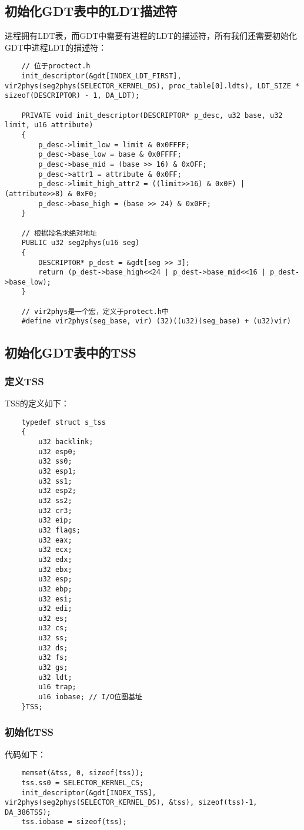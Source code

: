 \documentclass[a4paper,left=2.5cm,right=2.5cm,11pt]{report}
\begin{document}
\subsection{初始化GDT表中的LDT描述符}
	进程拥有LDT表，而GDT中需要有进程的LDT的描述符，所有我们还需要初始化GDT中进程LDT的描述符：
	\begin{lstlisting}
	// 位于proctect.h
	init_descriptor(&gdt[INDEX_LDT_FIRST], vir2phys(seg2phys(SELECTOR_KERNEL_DS), proc_table[0].ldts), LDT_SIZE * sizeof(DESCRIPTOR) - 1, DA_LDT);

	PRIVATE void init_descriptor(DESCRIPTOR* p_desc, u32 base, u32 limit, u16 attribute)
	{
		p_desc->limit_low = limit & 0x0FFFF;
		p_desc->base_low = base & 0x0FFFF;
		p_desc->base_mid = (base >> 16) & 0x0FF;
		p_desc->attr1 = attribute & 0x0FF;
		p_desc->limit_high_attr2 = ((limit>>16) & 0x0F) | (attribute>>8) & 0xF0;
		p_desc->base_high = (base >> 24) & 0x0FF;
	}

	// 根据段名求绝对地址
	PUBLIC u32 seg2phys(u16 seg)
	{
		DESCRIPTOR* p_dest = &gdt[seg >> 3];
		return (p_dest->base_high<<24 | p_dest->base_mid<<16 | p_dest->base_low);
	}

	// vir2phys是一个宏，定义于protect.h中
	#define vir2phys(seg_base, vir) (32)((u32)(seg_base) + (u32)vir)
	\end{lstlisting}

\subsection{初始化GDT表中的TSS}
\subsubsection{定义TSS}
	TSS的定义如下：
	\begin{lstlisting}
	typedef struct s_tss
	{
		u32 backlink;
		u32 esp0;
		u32 ss0;
		u32 esp1;
		u32 ss1;
		u32 esp2;
		u32 ss2;
		u32 cr3;
		u32 eip;
		u32 flags;
		u32 eax;
		u32 ecx;
		u32 edx;
		u32 ebx;
		u32 esp;
		u32 ebp;
		u32 esi;
		u32 edi;
		u32 es;
		u32 cs;
		u32 ss;
		u32 ds;
		u32 fs;
		u32 gs;
		u32 ldt;
		u16 trap;
		u16 iobase; // I/O位图基址
	}TSS;
	\end{lstlisting}

\subsubsection{初始化TSS}
	代码如下：
	\begin{lstlisting}
	memset(&tss, 0, sizeof(tss));
	tss.ss0 = SELECTOR_KERNEL_CS;
	init_descriptor(&gdt[INDEX_TSS], vir2phys(seg2phys(SELECTOR_KERNEL_DS), &tss), sizeof(tss)-1, DA_386TSS);
	tss.iobase = sizeof(tss);
	\end{lstlisting}
\end{document}
